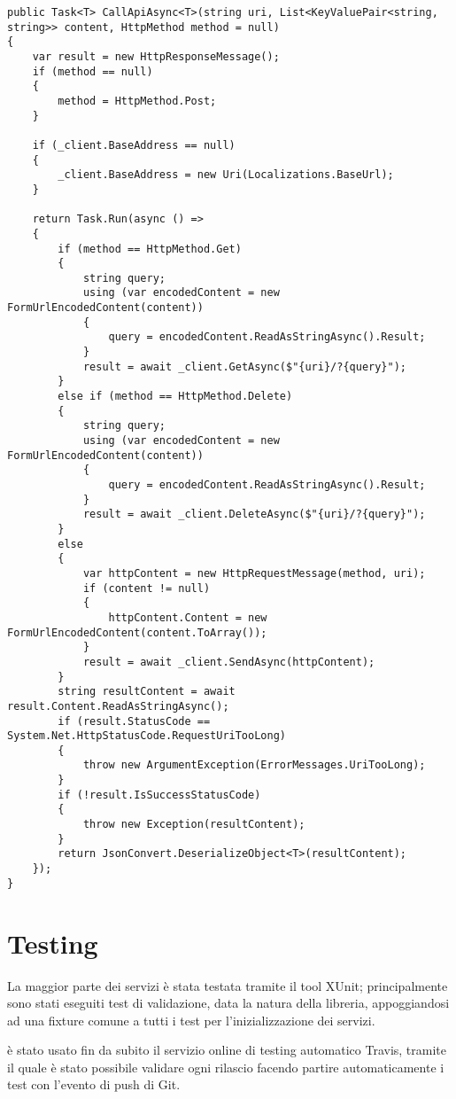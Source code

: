 \begin{lstlisting}[style=CSharpStyle, caption=Metodo generico del client per le chiamate HTTP]
public Task<T> CallApiAsync<T>(string uri, List<KeyValuePair<string, string>> content, HttpMethod method = null)
{
    var result = new HttpResponseMessage();
    if (method == null)
    {
        method = HttpMethod.Post;
    }

    if (_client.BaseAddress == null)
    {
        _client.BaseAddress = new Uri(Localizations.BaseUrl);
    }

    return Task.Run(async () =>
    {
        if (method == HttpMethod.Get)
        {
            string query;
            using (var encodedContent = new FormUrlEncodedContent(content))
            {
                query = encodedContent.ReadAsStringAsync().Result;
            }
            result = await _client.GetAsync($"{uri}/?{query}");
        }
        else if (method == HttpMethod.Delete)
        {
            string query;
            using (var encodedContent = new FormUrlEncodedContent(content))
            {
                query = encodedContent.ReadAsStringAsync().Result;
            }
            result = await _client.DeleteAsync($"{uri}/?{query}");
        }
        else
        {
            var httpContent = new HttpRequestMessage(method, uri);
            if (content != null)
            {
                httpContent.Content = new FormUrlEncodedContent(content.ToArray());
            }
            result = await _client.SendAsync(httpContent);
        }
        string resultContent = await result.Content.ReadAsStringAsync();
        if (result.StatusCode == System.Net.HttpStatusCode.RequestUriTooLong)
        {
            throw new ArgumentException(ErrorMessages.UriTooLong);
        }
        if (!result.IsSuccessStatusCode)
        {
            throw new Exception(resultContent); 
        }
        return JsonConvert.DeserializeObject<T>(resultContent);
    });
}
\end{lstlisting}

\section{Testing}
La maggior parte dei servizi è stata testata tramite il tool XUnit; principalmente sono stati eseguiti test di validazione, data la natura della libreria, appoggiandosi 
ad una fixture comune a tutti i test per l'inizializzazione dei servizi.

è stato usato fin da subito il servizio online di testing automatico Travis, tramite il quale è stato possibile validare ogni rilascio facendo 
partire automaticamente i test con l'evento di push di Git. 

